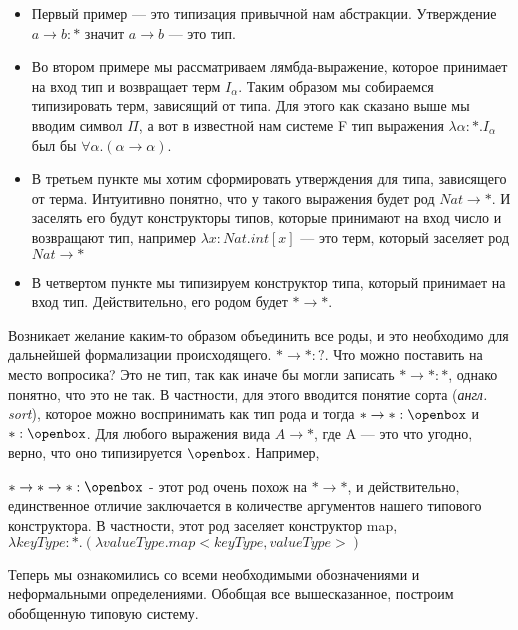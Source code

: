 \begin{itemize}

    \item Первый пример --- это типизация привычной нам абстракции. Утверждение $a \rightarrow b : *$ значит $a \rightarrow b$ --- это тип.

    \item Во втором примере мы рассматриваем лямбда-выражение, которое принимает на вход тип и возвращает терм $I_\alpha$. Таким образом мы собираемся типизировать терм, зависящий от типа. Для этого как сказано выше мы вводим символ $\Pi$, а вот в известной нам системе F тип выражения $\lambda \alpha : *.I_\alpha$ был бы $\forall \alpha. (\alpha \rightarrow \alpha)$.

    \item В третьем пункте мы хотим сформировать утверждения для типа, зависящего от терма. Интуитивно понятно, что у такого выражения будет род $Nat \rightarrow *$. И заселять его будут конструкторы типов, которые принимают на вход число и возвращают тип, например $\lambda x : Nat. int [x]$ --- это терм, который заселяет род  $Nat \rightarrow *$

    \item В четвертом пункте мы типизируем конструктор типа, который принимает на вход тип. Действительно, его родом будет $* \rightarrow *$.

\end{itemize}

Возникает желание каким-то образом объединить все роды, и это необходимо для дальнейшей формализации происходящего. $* \rightarrow * : ?$. Что можно поставить на место вопросика? Это не тип, так как иначе бы могли записать $* \rightarrow * : *$, однако понятно, что это не так. В частности, для этого вводится понятие сорта (\textit{англ. sort}), которое можно воспринимать как тип рода и тогда $* \rightarrow * : \openbox $ и $* : \openbox$. Для любого выражения вида $A \rightarrow *$, где A --- это что угодно, верно, что оно типизируется $\openbox$. Например,

$* \rightarrow * \rightarrow * : \openbox$ - этот род очень похож на $*
\rightarrow *$, и действительно, единственное отличие заключается в количестве
аргументов нашего типового конструктора. В частности, этот род заселяет
конструктор map, $\lambda keyType : *. (\lambda valueType. map<keyType,
valueType>)$

Теперь мы ознакомились со всеми необходимыми обозначениями и неформальными определениями. Обобщая все вышесказанное, построим обобщенную типовую систему.

